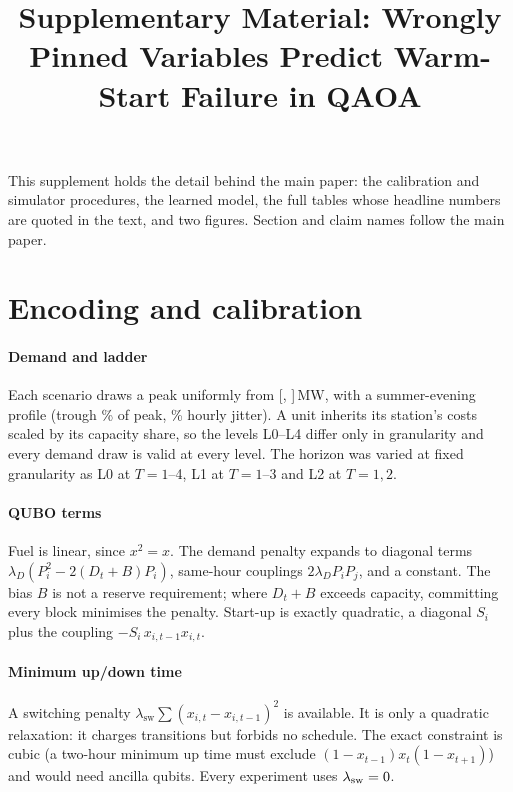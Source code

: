 \documentclass[10pt,conference]{IEEEtran}
\begin{document}
\title{Supplementary Material: Wrongly Pinned Variables Predict Warm-Start Failure in QAOA}
\author{
}
\maketitle

This supplement holds the detail behind the main paper: the calibration and simulator procedures, the learned model, the full tables whose headline numbers are quoted in the text, and two figures. Section and claim names follow the main paper.

\section{Encoding and calibration}

\paragraph{Demand and ladder} Each scenario draws a peak uniformly from [\LoadMin, \LoadMax]\,MW, with a summer-evening profile (trough \TroughPct\% of peak, \JitterPct\% hourly jitter). A unit inherits its station's costs scaled by its capacity share, so the levels L0--L4 differ only in granularity and every demand draw is valid at every level. The horizon was varied at fixed granularity as L0 at $T=1$--4, L1 at $T=1$--3 and L2 at $T=1,2$.

\paragraph{QUBO terms} Fuel is linear, since $x^2=x$. The demand penalty expands to diagonal terms $\lambda_D(P_i^2-2(D_t+B)P_i)$, same-hour couplings $2\lambda_DP_iP_j$, and a constant. The bias $B$ is not a reserve requirement; where $D_t+B$ exceeds capacity, committing every block minimises the penalty. Start-up is exactly quadratic, a diagonal $S_i$ plus the coupling $-S_i\,x_{i,t-1}x_{i,t}$.

\paragraph{Minimum up/down time} A switching penalty $\lambda_{\mathrm{sw}}\sum(x_{i,t}-x_{i,t-1})^2$ is available. It is only a quadratic relaxation: it charges transitions but forbids no schedule. The exact constraint is cubic (a two-hour minimum up time must exclude $(1-x_{t-1})x_t(1-x_{t+1})$) and would need ancilla qubits. Every experiment uses $\lambda_{\mathrm{sw}}=0$.
\end{document}
